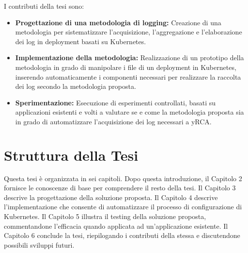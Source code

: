 I contributi della tesi sono:


\begin{itemize}
    \item \textbf{Progettazione di una metodologia di logging:} Creazione di una metodologia per sistematizzare l'acquisizione, l'aggregazione e l'elaborazione dei log in deployment basati su Kubernetes.
    
    \item \textbf{Implementazione della metodologia:} Realizzazione di un prototipo della metodologia in grado di manipolare i file di un deployment in Kubernetes, inserendo automaticamente i componenti necessari per realizzare la raccolta dei log secondo la metodologia proposta.
    
    \item \textbf{Sperimentazione:} Esecuzione di esperimenti controllati, basati su applicazioni esistenti e volti a valutare se e come la metodologia proposta sia in grado di automatizzare l'acquisizione dei log necessari a yRCA.


\end{itemize}


\section{Struttura della Tesi}

Questa tesi è organizzata in sei capitoli. Dopo questa introduzione, il Capitolo 2 fornisce le conoscenze di base per comprendere il resto della tesi. Il Capitolo 3 descrive la progettazione della soluzione proposta. Il Capitolo 4 descrive l'implementazione che consente di automatizzare il processo di configurazione di Kubernetes. Il Capitolo 5 illustra il testing della soluzione proposta, commentandone l'efficacia quando applicata ad un'applicazione esistente. Il Capitolo 6 conclude la tesi, riepilogando i contributi della stessa e discutendone possibili sviluppi futuri.